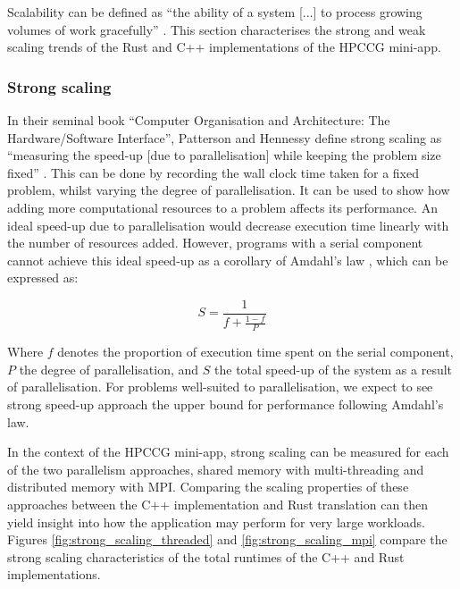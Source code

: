 Scalability can be defined as ``the ability of a system [...] to process growing volumes of work gracefully'' \cite{bondiCharacteristicsScalabilityTheir2000}. This section characterises the strong and weak scaling trends of the Rust and C++ implementations of the \acrshort{HPCCG} \acrshort{mini-app}.

\subsubsection{Strong scaling}
\label{sssec:strong-scaling}

In their seminal book ``Computer Organisation and Architecture: The Hardware/Software Interface'', Patterson and Hennessy define strong scaling as ``measuring the speed-up [due to parallelisation] while keeping the problem size fixed'' \cite{pattersonHennessyComputerOrganisationArchitecture}. This can be done by recording the wall clock time taken for a fixed problem, whilst varying the degree of parallelisation. It can be used to show how adding more computational resources to a problem affects its performance. An ideal speed-up due to parallelisation would decrease execution time linearly with the number of resources added. However, programs with a serial component cannot achieve this ideal speed-up as a corollary of Amdahl's law \cite{amdahlsLaw}, which can be expressed as:

\begin{equation}
    S = \frac{1}{f + \frac{1-f}{P}}
\end{equation}

Where $f$ denotes the proportion of execution time spent on the serial component, $P$ the degree of parallelisation, and $S$ the total speed-up of the system as a result of parallelisation. For problems well-suited to parallelisation, we expect to see strong speed-up approach the upper bound for performance following Amdahl's law.

In the context of the \acrshort{HPCCG} \acrshort{mini-app}, strong scaling can be measured for each of the two parallelism approaches, shared memory with multi-threading and distributed memory with MPI. Comparing the scaling properties of these approaches between the C++ implementation and Rust translation can then yield insight into how the application may perform for very large workloads. Figures \ref{fig:strong_scaling_threaded} and \ref{fig:strong_scaling_mpi} compare the strong scaling characteristics of the total runtimes of the C++ and Rust implementations.

